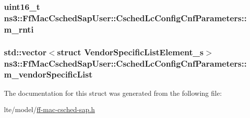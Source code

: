 \subsubsection[{\texorpdfstring{m\+\_\+rnti}{m_rnti}}]{\setlength{\rightskip}{0pt plus 5cm}uint16\+\_\+t ns3\+::\+Ff\+Mac\+Csched\+Sap\+User\+::\+Csched\+Lc\+Config\+Cnf\+Parameters\+::m\+\_\+rnti}\hypertarget{structns3_1_1FfMacCschedSapUser_1_1CschedLcConfigCnfParameters_aa93ab0581b26cc678979b2f2613b49d1}{}\label{structns3_1_1FfMacCschedSapUser_1_1CschedLcConfigCnfParameters_aa93ab0581b26cc678979b2f2613b49d1}
\subsubsection[{\texorpdfstring{m\+\_\+vendor\+Specific\+List}{m_vendorSpecificList}}]{\setlength{\rightskip}{0pt plus 5cm}std\+::vector$<$struct {\bf Vendor\+Specific\+List\+Element\+\_\+s}$>$ ns3\+::\+Ff\+Mac\+Csched\+Sap\+User\+::\+Csched\+Lc\+Config\+Cnf\+Parameters\+::m\+\_\+vendor\+Specific\+List}\hypertarget{structns3_1_1FfMacCschedSapUser_1_1CschedLcConfigCnfParameters_a930c6d902697524733c123f0a749c8f1}{}\label{structns3_1_1FfMacCschedSapUser_1_1CschedLcConfigCnfParameters_a930c6d902697524733c123f0a749c8f1}


The documentation for this struct was generated from the following file\+:\begin{DoxyCompactItemize}
\item 
lte/model/\hyperlink{ff-mac-csched-sap_8h}{ff-\/mac-\/csched-\/sap.\+h}\end{DoxyCompactItemize}

